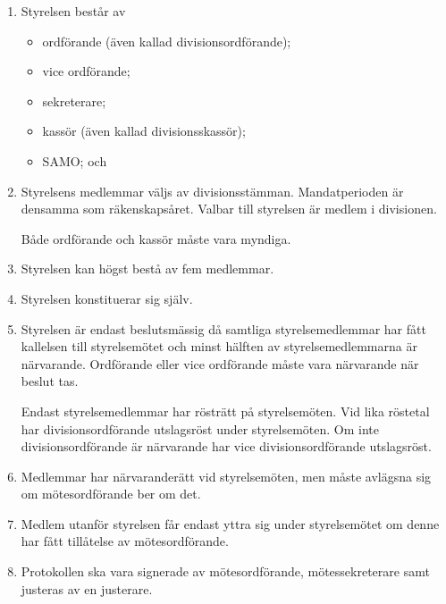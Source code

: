 \documentclass{dvd}
\begin{document}
	\begin{enumerate}[label=\arabic* §, ref=\arabic*]
		\item Styrelsen består av

		\begin{itemize}
			\item ordförande (även kallad divisionsordförande);

			\item vice ordförande;

			\item sekreterare;

			\item kassör (även kallad divisionsskassör);

			\item SAMO; och
		\end{itemize}

		\item Styrelsens medlemmar väljs av divisionsstämman.
		Mandatperioden är densamma som räkenskapsåret.
		Valbar till styrelsen är medlem i divisionen.

		Både ordförande och kassör måste vara myndiga.

		\item Styrelsen kan högst bestå av fem medlemmar.

		\item Styrelsen konstituerar sig själv.

		\item Styrelsen är endast beslutsmässig då samtliga styrelsemedlemmar har fått kallelsen till styrelsemötet och minst hälften av styrelsemedlemmarna är närvarande.
		Ordförande eller vice ordförande måste vara närvarande när beslut tas.
		
		Endast styrelsemedlemmar har rösträtt på styrelsemöten.
		Vid lika röstetal har divisionsordförande utslagsröst under styrelsemöten.
		Om inte divisionsordförande är närvarande har vice divisionsordförande utslagsröst.

		\item Medlemmar har närvaranderätt vid styrelsemöten, men måste avlägsna sig om mötesordförande ber om det.

		\item Medlem utanför styrelsen får endast yttra sig under styrelsemötet om denne har fått tillåtelse av mötesordförande.

		\item Protokollen ska vara signerade av mötesordförande, mötessekreterare samt justeras av en justerare.


\end{enumerate}
\end{document}
